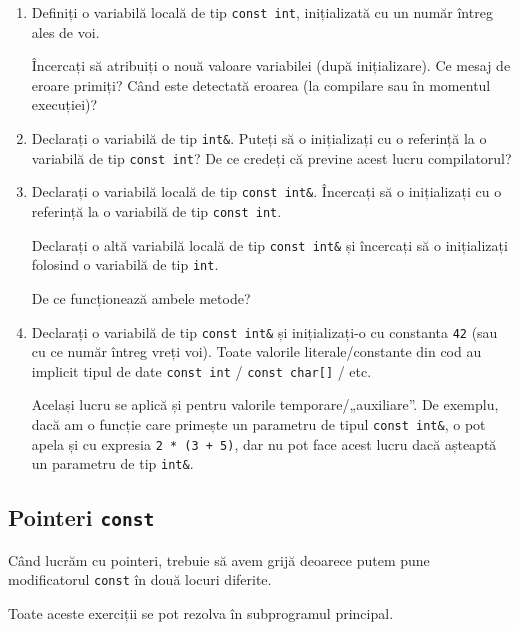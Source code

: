 \begin{enumerate}
    \item Definiți o variabilă locală de tip \texttt{const int}, inițializată cu un număr întreg ales de voi.
    
    Încercați să atribuiți o nouă valoare variabilei (după inițializare). Ce mesaj de eroare primiți? Când este detectată eroarea (la compilare sau în momentul execuției)?

    \item Declarați o variabilă de tip \texttt{int\&}. Puteți să o inițializați cu o referință la o variabilă de tip \texttt{const int}? De ce credeți că previne acest lucru compilatorul?

    \item Declarați o variabilă locală de tip \texttt{const int\&}. Încercați să o inițializați cu o referință la o variabilă de tip \texttt{const int}.
    
    Declarați o altă variabilă locală de tip \texttt{const int\&} și încercați să o inițializați folosind o variabilă de tip \texttt{int}.
    
    De ce funcționează ambele metode?

    \item Declarați o variabilă de tip \texttt{const int\&} și inițializați-o cu constanta \texttt{42} (sau cu ce număr întreg vreți voi). Toate valorile literale/constante din cod au implicit tipul de date \texttt{const int} / \texttt{const char[]} / etc.

    Același lucru se aplică și pentru valorile temporare/„auxiliare”. De exemplu, dacă am o funcție care primește un parametru de tipul \texttt{const int\&}, o pot apela și cu expresia \texttt{2 * (3 + 5)}, dar nu pot face acest lucru dacă așteaptă un parametru de tip \texttt{int\&}.
\end{enumerate}

\subsection*{Pointeri \texorpdfstring{\texttt{const}}{const}}

Când lucrăm cu pointeri, trebuie să avem grijă deoarece putem pune modificatorul \texttt{const} în două locuri diferite.

Toate aceste exerciții se pot rezolva în subprogramul principal.

